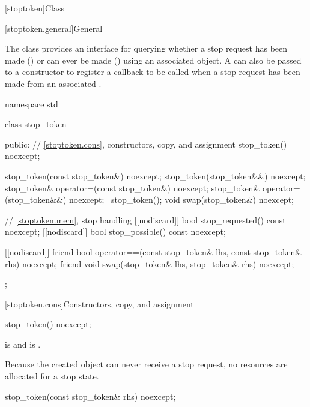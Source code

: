 [stoptoken]{Class }%
%

[stoptoken.general]{General}

\pnum
{}%
The class  provides an interface for querying whether
a stop request has been made ()
or can ever be made ()
using an associated  object.
A  can also be passed to a
 constructor
to register a callback to be called when a stop request has been made
from an associated .

\begin{codeblock}
namespace std {
  class stop_token {
  public:
    // \ref{stoptoken.cons}, constructors, copy, and assignment
    stop_token() noexcept;

    stop_token(const stop_token&) noexcept;
    stop_token(stop_token&&) noexcept;
    stop_token& operator=(const stop_token&) noexcept;
    stop_token& operator=(stop_token&&) noexcept;
    ~stop_token();
    void swap(stop_token&) noexcept;

    // \ref{stoptoken.mem}, stop handling
    [[nodiscard]] bool stop_requested() const noexcept;
    [[nodiscard]] bool stop_possible() const noexcept;

    [[nodiscard]] friend bool operator==(const stop_token& lhs, const stop_token& rhs) noexcept;
    friend void swap(stop_token& lhs, stop_token& rhs) noexcept;
  };
}
\end{codeblock}


[stoptoken.cons]{Constructors, copy, and assignment}

%
\begin{itemdecl}
stop_token() noexcept;
\end{itemdecl}

\begin{itemdescr}
\pnum
\ensures
{} is  and
 is .
\begin{note}
Because the created  object can never receive a stop request,
no resources are allocated for a stop state.
\end{note}
\end{itemdescr}

%
\begin{itemdecl}
stop_token(const stop_token& rhs) noexcept;
\end{itemdecl}

